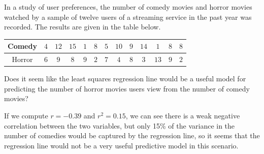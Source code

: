 \begin{example}
In a study of user preferences, the number of comedy movies and horror movies watched by a sample of twelve users of a streaming service in the past year was recorded. The results are given in the table below.

\renewcommand{\arraystretch}{1.25}
\begin{center}
\begin{tabular}{|c|c|c|c|c|c|c|c|c|c|c|c|c|}
\hline
Comedy & $4$ & $12$ & $15$ & $1$ & $8$ & $5$ & $10$ & $9$ & $14$ & $1$ & $8$ & $8$  \\
\hline
Horror & $6$ & $9$ & $8$ & $9$ & $2$ & $7$ & $4$ & $8$ & $3$ & $13$ & $9$ & $2$   \\
\hline
\end{tabular}
\end{center}

Does it seem like the least squares regression line would be a useful model for predicting the number of horror movies users view from the number of comedy movies?

If we compute $r = -0.39$ and $r^2 = 0.15$, we can see there is a weak negative correlation between the two variables, but only 15\% of the variance in the number of comedies would be captured by the regression line, so it seems that the regression line would not be a very useful predictive model in this scenario.
\end{example}


